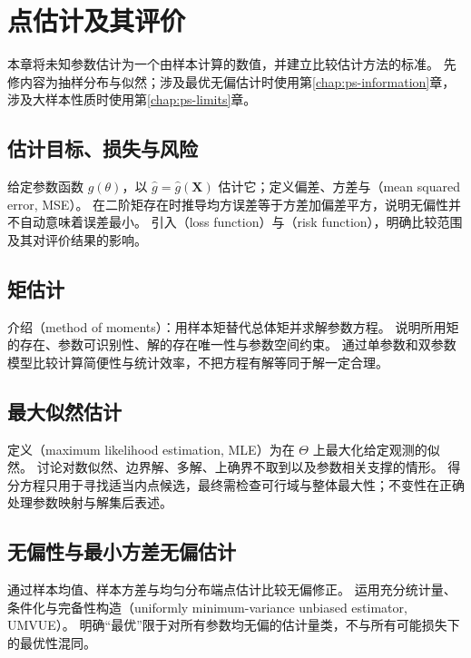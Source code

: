 \documentclass[UTF8,12pt,a4paper,fontset=fandol]{ctexbook}
\begin{document}
\chapter{点估计及其评价}
\label{chap:ps-point-estimation}

本章将未知参数估计为一个由样本计算的数值，并建立比较估计方法的标准。
先修内容为抽样分布与似然；涉及最优无偏估计时使用第\ref{chap:ps-information}章，涉及大样本性质时使用第\ref{chap:ps-limits}章。

\section{估计目标、损失与风险}
\label{sec:ps-estimation-criteria}
给定参数函数 $g(\theta)$，以 $\widehat g=\widehat g(\mathbf X)$ 估计它；定义偏差、方差与（mean squared error, MSE）。
在二阶矩存在时推导均方误差等于方差加偏差平方，说明无偏性并不自动意味着误差最小。
引入（loss function）与（risk function），明确比较范围及其对评价结果的影响。

\section{矩估计}
\label{sec:ps-method-moments}
介绍（method of moments）：用样本矩替代总体矩并求解参数方程。
说明所用矩的存在、参数可识别性、解的存在唯一性与参数空间约束。
通过单参数和双参数模型比较计算简便性与统计效率，不把方程有解等同于解一定合理。

\section{最大似然估计}
\label{sec:ps-maximum-likelihood}
定义（maximum likelihood estimation, MLE）为在 $\Theta$ 上最大化给定观测的似然。
讨论对数似然、边界解、多解、上确界不取到以及参数相关支撑的情形。
得分方程只用于寻找适当内点候选，最终需检查可行域与整体最大性；不变性在正确处理参数映射与解集后表述。

\section{无偏性与最小方差无偏估计}
\label{sec:ps-unbiased-estimation}
通过样本均值、样本方差与均匀分布端点估计比较无偏修正。
运用充分统计量、条件化与完备性构造（uniformly minimum-variance unbiased estimator, UMVUE）。
明确“最优”限于对所有参数均无偏的估计量类，不与所有可能损失下的最优性混同。
\end{document}
